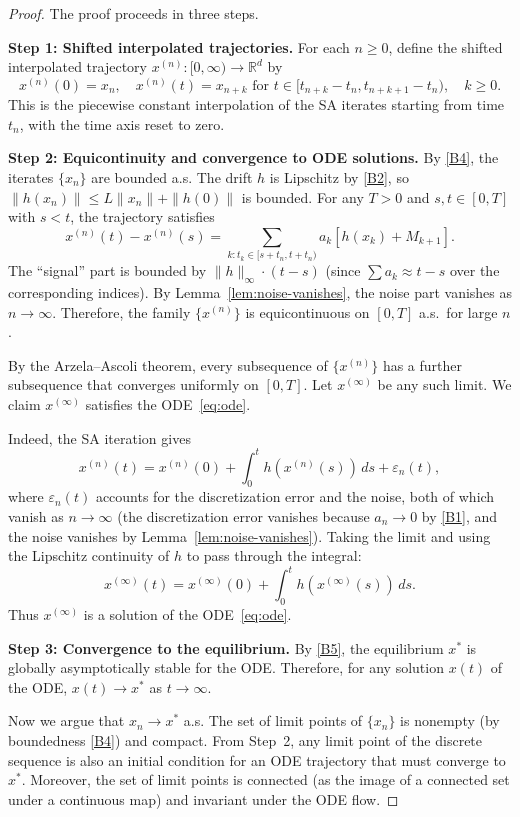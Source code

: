 \documentclass[11pt,a4paper]{article}
\theoremstyle{definition}
\theoremstyle{plain}
\theoremstyle{remark}
\newcommand{\R}{\mathbb{R}}
\begin{document}
\begin{proof}
The proof proceeds in three steps.

\medskip
\noindent\textbf{Step 1: Shifted interpolated trajectories.}
For each $n \geq 0$, define the shifted interpolated trajectory
$x^{(n)} : [0, \infty) \to \R^d$ by
\[
  x^{(n)}(0) = x_n, \quad
  x^{(n)}(t) = x_{n+k} \text{ for } t \in [t_{n+k} - t_n, t_{n+k+1} - t_n),
  \quad k \geq 0.
\]
This is the piecewise constant interpolation of the SA iterates starting from time
$t_n$, with the time axis reset to zero.

\medskip
\noindent\textbf{Step 2: Equicontinuity and convergence to ODE solutions.}
By \ref{B4}, the iterates $\{x_n\}$ are bounded a.s. The drift $h$ is Lipschitz
by \ref{B2}, so $\|h(x_n)\| \leq L\|x_n\| + \|h(0)\|$ is bounded. For any
$T > 0$ and $s, t \in [0, T]$ with $s < t$, the trajectory satisfies
\[
  x^{(n)}(t) - x^{(n)}(s) = \sum_{k : t_k \in [s+t_n, t+t_n)} a_k [h(x_k) + M_{k+1}].
\]
The ``signal'' part is bounded by $\|h\|_\infty \cdot (t-s)$ (since
$\sum a_k \approx t - s$ over the corresponding indices). By
Lemma~\ref{lem:noise-vanishes}, the noise part vanishes as $n \to \infty$. Therefore,
the family $\{x^{(n)}\}$ is equicontinuous on $[0, T]$ a.s.\ for large $n$.

By the Arzela--Ascoli theorem, every subsequence of $\{x^{(n)}\}$ has a further
subsequence that converges uniformly on $[0, T]$. Let $x^{(\infty)}$ be any such
limit. We claim $x^{(\infty)}$ satisfies the ODE~\eqref{eq:ode}.

Indeed, the SA iteration gives
\[
  x^{(n)}(t) = x^{(n)}(0) + \int_0^t h(x^{(n)}(s))\,ds + \varepsilon_n(t),
\]
where $\varepsilon_n(t)$ accounts for the discretization error and the noise, both
of which vanish as $n \to \infty$ (the discretization error vanishes because
$a_n \to 0$ by \ref{B1}, and the noise vanishes by Lemma~\ref{lem:noise-vanishes}).
Taking the limit and using the Lipschitz continuity of $h$ to pass through the
integral:
\[
  x^{(\infty)}(t) = x^{(\infty)}(0) + \int_0^t h(x^{(\infty)}(s))\,ds.
\]
Thus $x^{(\infty)}$ is a solution of the ODE~\eqref{eq:ode}.

\medskip
\noindent\textbf{Step 3: Convergence to the equilibrium.}
By \ref{B5}, the equilibrium $x^*$ is globally asymptotically stable for the ODE.
Therefore, for any solution $x(t)$ of the ODE, $x(t) \to x^*$ as $t \to \infty$.

Now we argue that $x_n \to x^*$ a.s. The set of limit points of $\{x_n\}$ is
nonempty (by boundedness \ref{B4}) and compact. From Step~2, any limit point of the
discrete sequence is also an initial condition for an ODE trajectory that must
converge to $x^*$. Moreover, the set of limit points is connected (as the image of
a connected set under a continuous map) and invariant under the ODE flow.


\end{proof}
\end{document}
